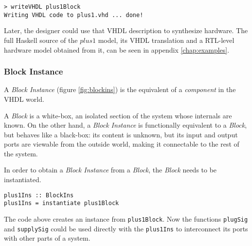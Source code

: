 \begin{verbatim}
> writeVHDL plus1Block
Writing VHDL code to plus1.vhd ... done!
\end{verbatim}

Later, the designer could use that VHDL description to synthesize
hardware.  The full Haskell source of the $\mathit{plus1}$ model, its
VHDL translation and a RTL-level hardware model obtained from it, can
be seen in appendix \ref{chap:examples}.

\subsubsection{Block Instance}

A \textit{Block Instance} (figure \ref{fig:blockins}) is the
equivalent of a \textit{component} in the VHDL world. 

A \textit{Block} is a white-box, an isolated section of the system
whose internals are known. On the other hand, a \textit{Block
  Instance} is functionally equivalent to a \textit{Block}, but
behaves like a black-box: its content is unknown, but its input and
output ports are viewable from the outside world, making it
connectable to the rest of the system.

In order to obtain a \textit{Block Instance} from a \textit{Block},
the \textit{Block} needs to be instantiated. 


\begin{lstlisting}
plus1Ins :: BlockIns
plus1Ins = instantiate plus1Block
\end{lstlisting}

The code above creates an instance from \texttt{plus1Block}. Now the
functions \texttt{plugSig} and \texttt{supplySig} could be used
directly with the \texttt{plus1Ins} to interconnect its ports with
other parts of a system.





